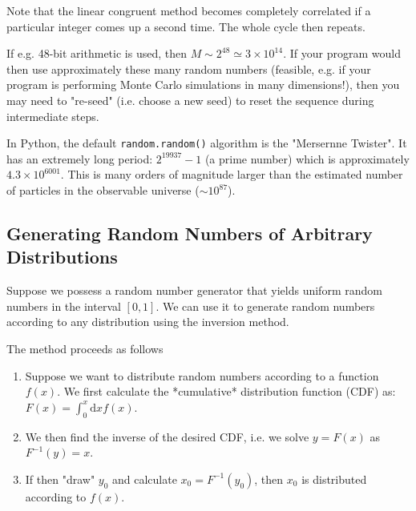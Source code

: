 \documentclass[../../../main.tex]{subfiles}
\begin{document}
Note that the linear congruent method becomes completely correlated if a particular integer comes up a second time. 
The whole cycle then repeats.

If e.g. 48-bit arithmetic is used, then $M \sim 2^{48} \simeq 3\times 10^{14}$. 
If your program would then use approximately these many random numbers (feasible, e.g. if your program is performing Monte Carlo simulations in many dimensions!), then you may need to "re-seed" (i.e. choose a new seed) to reset the sequence during intermediate steps. 

In Python, the default \verb|random.random()| algorithm is the "Mersernne Twister". 
It has an extremely long period: $2^{19937} -1$ (a prime number) which is approximately $4.3 \times 10^{6001}$. 
This is many orders of magnitude larger than the estimated number of particles in the observable universe ($\sim 10^{87}$).

\subsection{Generating Random Numbers of Arbitrary Distributions}

Suppose we possess a random number generator that yields uniform random numbers in the interval $[0,1]$. We can use it to generate random numbers according to any distribution using the inversion method. 

The method proceeds as follows
\begin{enumerate}
    \item Suppose we want to distribute random numbers according to a function $f(x)$. We first calculate the *cumulative* distribution function (CDF) as: $F(x) = \int^x_0 \mathrm{d}x f(x)$.
    \item We then find the inverse of the desired CDF, i.e. we solve $y=F(x)$ as $F^{-1}(y)=x$.
    \item If then "draw" $y_0$ and calculate $x_0 = F^{-1}(y_0)$, then $x_0$ is distributed according to $f(x)$.
\end{enumerate}
\end{document}

